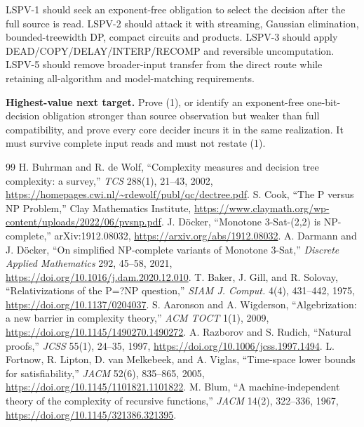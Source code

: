 \documentclass[11pt]{article}
\begin{document}
LSPV-1 should seek an exponent-free obligation to select the decision after
the full source is read.  LSPV-2 should attack it with streaming, Gaussian
elimination, bounded-treewidth DP, compact circuits and products.  LSPV-3
should apply DEAD/COPY/DELAY/INTERP/RECOMP and reversible uncomputation.
LSPV-5 should remove broader-input transfer from the direct route while
retaining all-algorithm and model-matching requirements.

\textbf{Highest-value next target.} Prove (1), or identify an exponent-free
one-bit-decision obligation stronger than source observation but weaker than
full compatibility, and prove every core decider incurs it in the same
realization.  It must survive complete input reads and must not restate (1).

\begin{thebibliography}{99}
 H. Buhrman and R. de Wolf, ``Complexity measures and decision
tree complexity: a survey,'' \emph{TCS} 288(1), 21--43, 2002,
\url{https://homepages.cwi.nl/~rdewolf/publ/qc/dectree.pdf}.
 S. Cook, ``The P versus NP Problem,'' Clay Mathematics
Institute, \url{https://www.claymath.org/wp-content/uploads/2022/06/pvsnp.pdf}.
 J. Döcker, ``Monotone 3-Sat-(2,2) is NP-complete,''
arXiv:1912.08032, \url{https://arxiv.org/abs/1912.08032}.
 A. Darmann and J. Döcker, ``On simplified
NP-complete variants of Monotone 3-Sat,'' \emph{Discrete Applied Mathematics}
292, 45--58, 2021, \url{https://doi.org/10.1016/j.dam.2020.12.010}.
 T. Baker, J. Gill, and R. Solovay, ``Relativizations of the
P=?NP question,'' \emph{SIAM J. Comput.} 4(4), 431--442, 1975,
\url{https://doi.org/10.1137/0204037}.
 S. Aaronson and A. Wigderson, ``Algebrization: a new barrier in
complexity theory,'' \emph{ACM TOCT} 1(1), 2009,
\url{https://doi.org/10.1145/1490270.1490272}.
 A. Razborov and S. Rudich, ``Natural proofs,'' \emph{JCSS}
55(1), 24--35, 1997, \url{https://doi.org/10.1006/jcss.1997.1494}.
 L. Fortnow, R. Lipton, D. van Melkebeek, and A. Viglas,
``Time-space lower bounds for satisfiability,'' \emph{JACM} 52(6), 835--865,
2005, \url{https://doi.org/10.1145/1101821.1101822}.
 M. Blum, ``A machine-independent theory of the complexity of
recursive functions,'' \emph{JACM} 14(2), 322--336, 1967,
\url{https://doi.org/10.1145/321386.321395}.
\end{thebibliography}

\end{document}
